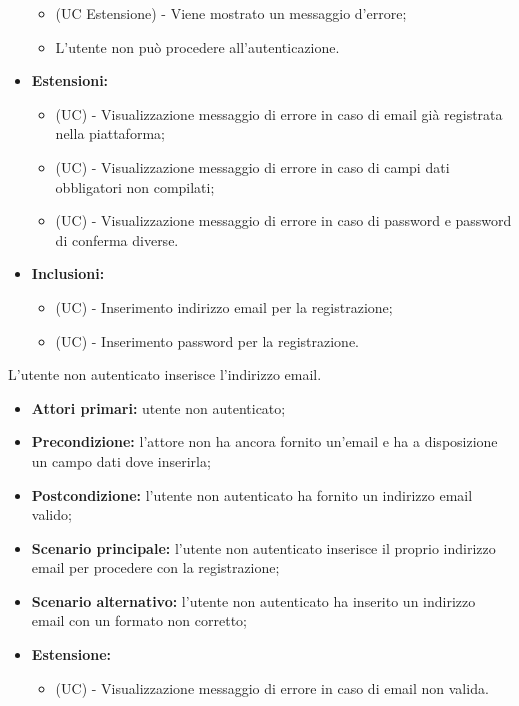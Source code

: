 \begin{itemize}
	\begin{itemize}
		\item (UC Estensione) - Viene mostrato un messaggio d'errore;
		\item L'utente non può procedere all'autenticazione.
	\end{itemize}
    \item \textbf{Estensioni:}
    \begin{itemize}
        \item (UC) - Visualizzazione messaggio di errore in caso di email già registrata nella piattaforma;
        \item (UC) - Visualizzazione messaggio di errore in caso di campi dati obbligatori non compilati;
        \item (UC) - Visualizzazione messaggio di errore in caso di password e password di conferma diverse.
    \end{itemize}
	\item \textbf{Inclusioni:}
	\begin{itemize}
		\item (UC) - Inserimento indirizzo email per la registrazione;
		\item (UC) - Inserimento password per la registrazione.
	\end{itemize}
\end{itemize}

L'utente non autenticato inserisce l'indirizzo email.
\begin{itemize}
	\item \textbf{Attori primari:} utente non autenticato;
	\item \textbf{Precondizione:} l'attore non ha ancora fornito un'email e ha a disposizione un campo dati dove inserirla;
	\item \textbf{Postcondizione:} l'utente non autenticato ha fornito un indirizzo email valido;
	\item \textbf{Scenario principale:} l'utente non autenticato inserisce il proprio indirizzo email per procedere con la registrazione;
	\item \textbf{Scenario alternativo:} l'utente non autenticato ha inserito un indirizzo email con un formato non corretto;
	\item \textbf{Estensione:}
	\begin{itemize}
		\item (UC) - Visualizzazione messaggio di errore in caso di email non valida.
	\end{itemize}
\end{itemize}

